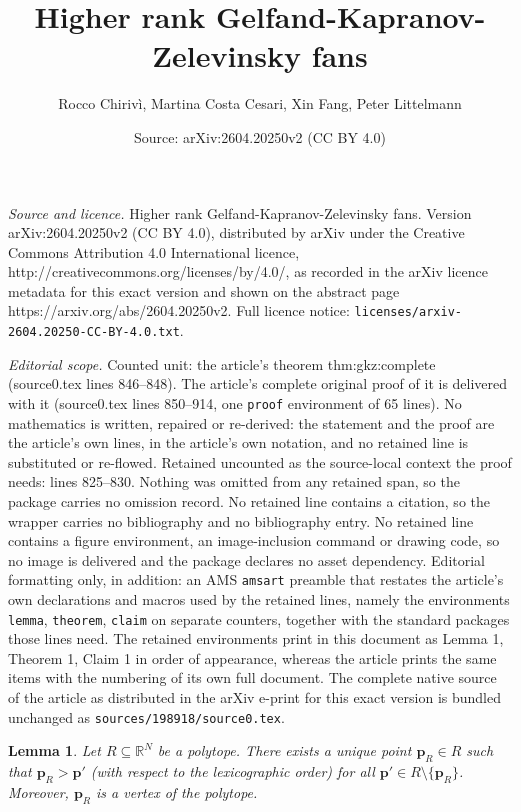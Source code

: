 \documentclass[10pt,a4paper]{amsart}
\title{Higher rank Gelfand-Kapranov-Zelevinsky fans}
\author{Rocco Chiriv\`i, Martina Costa Cesari, Xin Fang, Peter Littelmann}
\date{Source: arXiv:2604.20250v2 (CC BY 4.0)}
\newtheorem{lemma}{Lemma}
\begin{document}
\maketitle

\noindent\emph{Source and licence.} Higher rank Gelfand-Kapranov-Zelevinsky fans. Version arXiv:2604.20250v2 (CC BY 4.0), distributed by arXiv under the Creative Commons Attribution 4.0 International licence, http://creativecommons.org/licenses/by/4.0/, as recorded in the arXiv licence metadata for this exact version and shown on the abstract page https://arxiv.org/abs/2604.20250v2. Full licence notice: \texttt{licenses/arxiv-2604.20250-CC-BY-4.0.txt}.\par\smallskip

\noindent\textit{Editorial scope.} Counted unit: the article's theorem thm:gkz:complete (source0.tex lines 846--848). The article's complete original proof of it is delivered with it (source0.tex lines 850--914, one \texttt{proof} environment of 65 lines). No mathematics is written, repaired or re-derived: the statement and the proof are the article's own lines, in the article's own notation, and no retained line is substituted or re-flowed.  Retained uncounted as the source-local context the proof needs: lines 825--830.  Nothing was omitted from any retained span, so the package carries no omission record.  No retained line contains a citation, so the wrapper carries no bibliography and no bibliography entry.  No retained line contains a figure environment, an image-inclusion command or drawing code, so no image is delivered and the package declares no asset dependency.  Editorial formatting only, in addition: an AMS \texttt{amsart} preamble that restates the article's own declarations and macros used by the retained lines, namely the environments \texttt{lemma}, \texttt{theorem}, \texttt{claim} on separate counters, together with the standard packages those lines need.  The retained environments print in this document as Lemma 1, Theorem 1, Claim 1 in order of appearance, whereas the article prints the same items with the numbering of its own full document.  The complete native source of the article as distributed in the arXiv e-print for this exact version is bundled unchanged as \texttt{sources/198918/source0.tex}.
\begin{lemma}\label{lemma:max:in:polytope}
Let  $R\subseteq \mathbb R^{N}$ be a polytope. There exists a unique point 
$\mathbf p_R\in R$ such that $\mathbf p_R>\mathbf p'$ (with respect to the lexicographic order) 
for all $\mathbf p'\in R\setminus\{\mathbf p_R\}$. Moreover, 
$\mathbf p_R$ is a vertex of the polytope.
\end{lemma}
\end{document}
